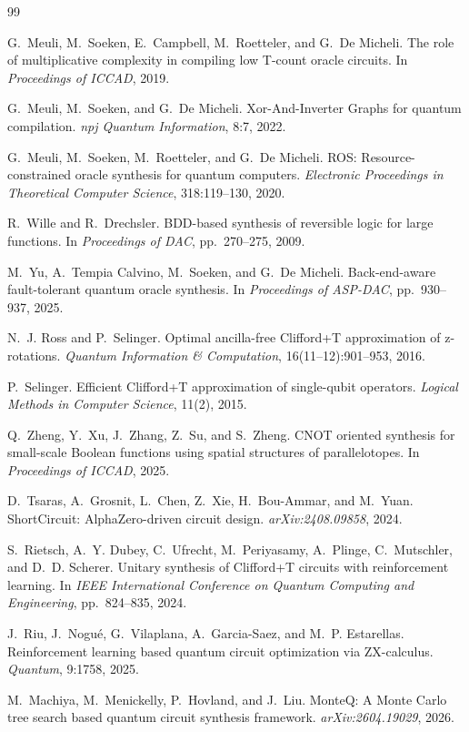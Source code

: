 \documentclass[UTF8,fontset=macnew,11pt]{ctexart}
\begin{document}
\begin{thebibliography}{99}

G.~Meuli, M.~Soeken, E.~Campbell, M.~Roetteler, and G.~De Micheli.
\newblock The role of multiplicative complexity in compiling low T-count oracle circuits.
\newblock In \emph{Proceedings of ICCAD}, 2019.

G.~Meuli, M.~Soeken, and G.~De Micheli.
\newblock Xor-And-Inverter Graphs for quantum compilation.
\newblock \emph{npj Quantum Information}, 8:7, 2022.

G.~Meuli, M.~Soeken, M.~Roetteler, and G.~De Micheli.
\newblock ROS: Resource-constrained oracle synthesis for quantum computers.
\newblock \emph{Electronic Proceedings in Theoretical Computer Science}, 318:119--130, 2020.

R.~Wille and R.~Drechsler.
\newblock BDD-based synthesis of reversible logic for large functions.
\newblock In \emph{Proceedings of DAC}, pp.~270--275, 2009.

M.~Yu, A.~Tempia Calvino, M.~Soeken, and G.~De Micheli.
\newblock Back-end-aware fault-tolerant quantum oracle synthesis.
\newblock In \emph{Proceedings of ASP-DAC}, pp.~930--937, 2025.

N.~J. Ross and P.~Selinger.
\newblock Optimal ancilla-free Clifford+T approximation of z-rotations.
\newblock \emph{Quantum Information \& Computation}, 16(11--12):901--953, 2016.

P.~Selinger.
\newblock Efficient Clifford+T approximation of single-qubit operators.
\newblock \emph{Logical Methods in Computer Science}, 11(2), 2015.

Q.~Zheng, Y.~Xu, J.~Zhang, Z.~Su, and S.~Zheng.
\newblock CNOT oriented synthesis for small-scale Boolean functions using spatial structures of parallelotopes.
\newblock In \emph{Proceedings of ICCAD}, 2025.

D.~Tsaras, A.~Grosnit, L.~Chen, Z.~Xie, H.~Bou-Ammar, and M.~Yuan.
\newblock ShortCircuit: AlphaZero-driven circuit design.
\newblock \emph{arXiv:2408.09858}, 2024.

S.~Rietsch, A.~Y. Dubey, C.~Ufrecht, M.~Periyasamy, A.~Plinge, C.~Mutschler, and D.~D. Scherer.
\newblock Unitary synthesis of Clifford+T circuits with reinforcement learning.
\newblock In \emph{IEEE International Conference on Quantum Computing and Engineering}, pp.~824--835, 2024.

J.~Riu, J.~Nogu{\'e}, G.~Vilaplana, A.~Garcia-Saez, and M.~P. Estarellas.
\newblock Reinforcement learning based quantum circuit optimization via ZX-calculus.
\newblock \emph{Quantum}, 9:1758, 2025.

M.~Machiya, M.~Menickelly, P.~Hovland, and J.~Liu.
\newblock MonteQ: A Monte Carlo tree search based quantum circuit synthesis framework.
\newblock \emph{arXiv:2604.19029}, 2026.

\end{thebibliography}
\end{document}
